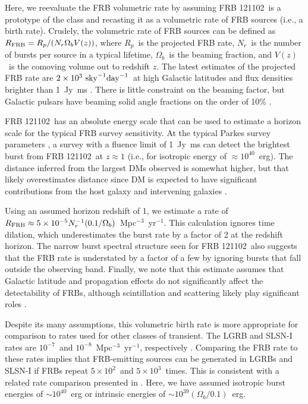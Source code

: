 \documentclass[twocolumn]{aastex61}
\newcommand{\frb}{FRB 121102}
\begin{document}
Here, we reevaluate the FRB volumetric rate by assuming \frb\ is a prototype of the class and recasting it as a volumetric rate of FRB sources (i.e., a birth rate). Crudely, the volumetric rate of FRB sources can be defined as $R_{\rm{FRB}} = R_p /(N_r \Omega_b V (z))$, where $R_p$\ is the projected FRB rate, $N_r$\ is the number of bursts per source in a typical lifetime, $\Omega_b$\ is the beaming fraction, and $V(z)$\ is the comoving volume out to redshift $z$. The latest estimates of the projected FRB rate are $2\times10^3\ \rm{sky}^{-1} \rm{day}^{-1}$\ at high Galactic latitudes and flux densities brighter than 1~Jy~ms \citep{2016arXiv161100458L, 2016MNRAS.460L..30C, 2016MNRAS.455.2207R}. There is little constraint on the beaming factor, but Galactic pulsars have beaming solid angle fractions on the order of 10\% \citep{1998MNRAS.298..625T}.

\frb\ has an absolute energy scale that can be used to estimate a horizon scale for the typical FRB survey sensitivity. At the typical Parkes survey parameters \citep[e.g.,][]{2016MNRAS.460L..30C}, a survey with a fluence limit of 1~Jy~ms can detect the brightest burst from \frb\ at $z\approx1$ (i.e., for isotropic energy of $\approx10^{40}$~erg). The distance inferred from the largest DMs observed \citep[$\sim1500$\ pc cm$^{-3}$;][]{2016MNRAS.460L..30C} is somewhat higher, but that likely overestimates distance since DM is expected to have significant contributions from the host galaxy and intervening galaxies \citep{OPT, 2014ApJ...780L..33M}.

Using an assumed horizon redshift of 1, we estimate a rate of $R_{\rm{FRB}} \approx 5\times10^{-5} N_r^{-1} (0.1/\Omega_b)$\ Mpc$^{-3}$\ yr$^{-1}$. This calculation ignores time dilation, which underestimates the burst rate by a factor of 2 at the redshift horizon. The narrow burst spectral structure seen for \frb\ also suggests that the FRB rate is understated by a factor of a few by ignoring bursts that fall outside the observing band. Finally, we note that this estimate assumes that Galactic latitude and propagation effects do not significantly affect the detectability of FRBs, although scintillation and scattering likely play significant roles \citep{2015MNRAS.451.3278M, 2017arXiv170306580C}.

Despite its many assumptions, this volumetric birth rate is more appropriate for comparison to rates used for other classes of transient. The LGRB and SLSN-I rates are $10^{-7}$\ and $10^{-8}$\ Mpc$^{-3}$\ yr$^{-1}$, respectively \citep{2007ApJ...657L..73G,2012Sci...337..927G}. Comparing the FRB rate to these rates implies that FRB-emitting sources can be generated in LGRBs and SLSN-I if FRBs repeat $5\times10^2$\ and $5\times10^3$\ times. This is consistent with a related rate comparison presented in \citet{2017arXiv170400022N}. Here, we have assumed isotropic burst energies of $\sim10^{40}$~erg or intrinsic energies of $\sim10^{39} (\Omega_b/0.1)$~erg. 
\end{document}
